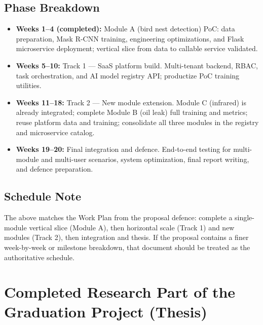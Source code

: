\documentclass[12pt,a4paper]{article}
\begin{document}
\subsection{Phase Breakdown}

\begin{itemize}
  \item \textbf{Weeks 1--4 (completed):} Module A (bird nest detection) PoC: data preparation, Mask R-CNN training, engineering optimizations, and Flask microservice deployment; vertical slice from data to callable service validated.
  \item \textbf{Weeks 5--10:} Track 1 --- SaaS platform build. Multi-tenant backend, RBAC, task orchestration, and AI model registry API; productize PoC training utilities.
  \item \textbf{Weeks 11--18:} Track 2 --- New module extension. Module C (infrared) is already integrated; complete Module B (oil leak) full training and metrics; reuse platform data and training; consolidate all three modules in the registry and microservice catalog.
  \item \textbf{Weeks 19--20:} Final integration and defence. End-to-end testing for multi-module and multi-user scenarios, system optimization, final report writing, and defence preparation.
\end{itemize}

\subsection{Schedule Note}

The above matches the Work Plan from the proposal defence: complete a single-module vertical slice (Module A), then horizontal scale (Track 1) and new modules (Track 2), then integration and thesis. If the proposal contains a finer week-by-week or milestone breakdown, that document should be treated as the authoritative schedule.


\section{Completed Research Part of the Graduation Project (Thesis)}
\end{document}
